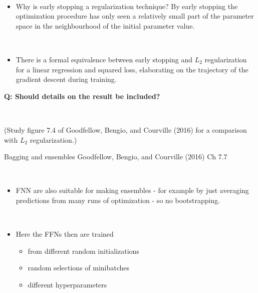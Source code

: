 \documentclass[
  ignorenonframetext,
]{beamer}
\providecommand{\tightlist}{%
  \setlength{\itemsep}{0pt}\setlength{\parskip}{0pt}}
\begin{document}
\begin{frame}
\(~\)

\begin{itemize}
\tightlist
\item
  Why is early stopping a regularization technique? By early stopping
  the optimization procedure has only seen a relatively small part of
  the parameter space in the neighbourhood of the initial parameter
  value.
\end{itemize}

\(~\)

\begin{itemize}
\tightlist
\item
  There is a formal equivalence between early stopping and \(L_2\)
  regularization for a linear regression and squared loss, elaborating
  on the trajectory of the gradient descent during training.
\end{itemize}

\textbf{Q: Should details on the result be included?}

\(~\)

(Study figure 7.4 of Goodfellow, Bengio, and Courville (2016) for a
comparison with \(L_2\) regularization.)
\end{frame}

\begin{frame}
\begin{block}{Bagging and ensembles}
\protect\hypertarget{bagging-and-ensembles}{}
Goodfellow, Bengio, and Courville (2016) Ch 7.7

\(~\)

\begin{itemize}
\tightlist
\item
  FNN are also suitable for making ensembles - for example by just
  averaging predictions from many runs of optimization - so no
  bootstrapping.
\end{itemize}

\(~\)

\begin{itemize}
\tightlist
\item
  Here the FFNs then are trained

  \begin{itemize}
  \tightlist
  \item
    from different random initializations
  \item
    random selections of minibatches
  \item
    different hyperparameters
  \end{itemize}
\end{itemize}

\(~\)
\end{block}
\end{frame}
\end{document}
